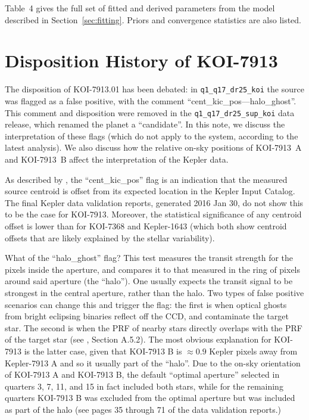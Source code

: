 \documentclass[12pt,twocolumn,tighten,linenumbers,trackchanges]{aastex63}
\begin{document}
Table~4 gives the full set of fitted and derived
parameters from the model described in Section~\ref{sec:fitting}.
Priors and convergence statistics are also listed.


\section{Disposition History of KOI-7913}
\label{app:koi7913}

The disposition of KOI-7913.01 has been debated: in
\texttt{q1\_q17\_dr25\_koi} the source was flagged as a false
positive, with the comment ``cent\_kic\_pos---halo\_ghost''.  This
comment and disposition were removed in the
\texttt{q1\_q17\_dr25\_sup\_koi} data release, which renamed the
planet a ``candidate''.  In this note, we discuss the interpretation
of these flags (which do not apply to the system, according to the
latest analysis).  We also discuss how the relative on-sky positions of
KOI-7913~A and KOI-7913~B affect the interpretation of the Kepler
data.

As described by \citet{thompson_planetary_2018}, the
``cent\_kic\_pos'' flag is an indication that the measured source
centroid is offset from its expected location in the Kepler Input
Catalog.  The final Kepler data validation reports, generated 2016 Jan
30, do not show this to be the case for KOI-7913.  Moreover, the
statistical significance of any centroid offset is lower than for
KOI-7368 and Kepler-1643 (which both show centroid offsets that are
likely explained by the stellar variability).

What of the ``halo\_ghost'' flag?  This test measures the transit
strength for the pixels inside the aperture, and compares it to that
measured in the ring of pixels around said aperture (the ``halo'').
One usually expects the transit signal to be strongest in the
central aperture, rather than the halo.  Two types of false positive
scenarios can change this and trigger the flag: the first is when
optical ghosts from bright eclipsing binaries reflect off the CCD, and
contaminate the target star.  The second is when the PRF of nearby
stars directly overlaps with the PRF of the target star (see
\citealt{thompson_planetary_2018}, Section A.5.2).  The most obvious
explanation for KOI-7913 is the latter case, given that KOI-7913 B is
$\approx0.9$ Kepler pixels away from Kepler-7913 A and so it usually
part of the ``halo''.  Due to the on-sky orientation of KOI-7913 A and
KOI-7913 B, the default ``optimal aperture'' selected in quarters 3,
7, 11, and 15 in fact included both stars, while for the remaining
quarters KOI-7913 B was excluded from the optimal aperture but was
included as part of the halo (see pages 35 through 71 of the data
validation reports.)  
\end{document}
